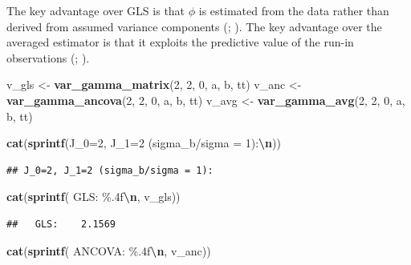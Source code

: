 \documentclass[
  11pt,
]{article}
\newenvironment{Shaded}{\begin{snugshade}}{\end{snugshade}}
\newcommand{\DecValTok}[1]{\textcolor[rgb]{0.00,0.00,0.81}{#1}}
\newcommand{\FunctionTok}[1]{\textcolor[rgb]{0.13,0.29,0.53}{\textbf{#1}}}
\newcommand{\NormalTok}[1]{#1}
\newcommand{\OtherTok}[1]{\textcolor[rgb]{0.56,0.35,0.01}{#1}}
\newcommand{\SpecialCharTok}[1]{\textcolor[rgb]{0.81,0.36,0.00}{\textbf{#1}}}
\newcommand{\StringTok}[1]{\textcolor[rgb]{0.31,0.60,0.02}{#1}}
\begin{document}
The key advantage over GLS is that \(\phi\) is estimated from the data
rather than derived from assumed variance components
(; ). The key advantage over the averaged estimator is that it
exploits the predictive value of the run-in observations
(;
).

\begin{Shaded}
\begin{Highlighting}[]
\NormalTok{v\_gls }\OtherTok{\textless{}{-}} \FunctionTok{var\_gamma\_matrix}\NormalTok{(}\DecValTok{2}\NormalTok{, }\DecValTok{2}\NormalTok{, }\DecValTok{0}\NormalTok{, a, b, tt)}
\NormalTok{v\_anc }\OtherTok{\textless{}{-}} \FunctionTok{var\_gamma\_ancova}\NormalTok{(}\DecValTok{2}\NormalTok{, }\DecValTok{2}\NormalTok{, }\DecValTok{0}\NormalTok{, a, b, tt)}
\NormalTok{v\_avg }\OtherTok{\textless{}{-}} \FunctionTok{var\_gamma\_avg}\NormalTok{(}\DecValTok{2}\NormalTok{, }\DecValTok{2}\NormalTok{, }\DecValTok{0}\NormalTok{, a, b, tt)}

\FunctionTok{cat}\NormalTok{(}\FunctionTok{sprintf}\NormalTok{(}\StringTok{\textquotesingle{}J\_0=2, J\_1=2 (sigma\_b/sigma = 1):}\SpecialCharTok{\textbackslash{}n}\StringTok{\textquotesingle{}}\NormalTok{))}
\end{Highlighting}
\end{Shaded}

\begin{verbatim}
## J_0=2, J_1=2 (sigma_b/sigma = 1):
\end{verbatim}

\begin{Shaded}
\begin{Highlighting}[]
\FunctionTok{cat}\NormalTok{(}\FunctionTok{sprintf}\NormalTok{(}\StringTok{\textquotesingle{}  GLS:    \%.4f}\SpecialCharTok{\textbackslash{}n}\StringTok{\textquotesingle{}}\NormalTok{, v\_gls))}
\end{Highlighting}
\end{Shaded}

\begin{verbatim}
##   GLS:    2.1569
\end{verbatim}

\begin{Shaded}
\begin{Highlighting}[]
\FunctionTok{cat}\NormalTok{(}\FunctionTok{sprintf}\NormalTok{(}\StringTok{\textquotesingle{}  ANCOVA: \%.4f}\SpecialCharTok{\textbackslash{}n}\StringTok{\textquotesingle{}}\NormalTok{, v\_anc))}
\end{Highlighting}
\end{Shaded}
\end{document}
